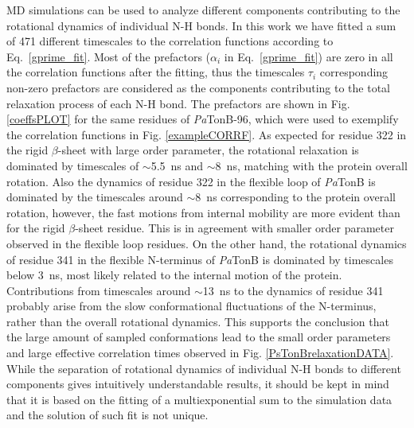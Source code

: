 \documentclass[journal=jpcbfk,manuscript=article]{achemso}
\begin{document}
MD simulations can be used to analyze different components contributing to
the rotational dynamics of individual N-H bonds.
In this work we have fitted a sum of 471 different
timescales to the correlation functions according to Eq.~\ref{gprime_fit}.
Most of the prefactors ($\alpha_i$ in Eq.~\ref{gprime_fit}) are zero
in all the correlation functions after the fitting,
thus the timescales $\tau_i$ corresponding non-zero prefactors
are considered as the components contributing to the total relaxation process of each N-H bond.
The prefactors are shown in Fig. \ref{coeffsPLOT} for the same residues
of {\it Pa}TonB-96, which were used to exemplify the correlation functions in Fig. \ref{exampleCORRF}.
As expected for residue 322 in the rigid $\beta$-sheet with large order parameter,
the rotational relaxation is dominated by timescales of $\sim$5.5~ns and $\sim$8~ns,
matching with the protein overall
rotation. Also the dynamics of residue 322 in the flexible loop of {\it Pa}TonB is
dominated by the timescales around $\sim$8~ns corresponding to the protein overall rotation,
however, the fast motions from internal mobility are more evident than for the
rigid $\beta$-sheet residue. This is in agreement with smaller order parameter observed
in the flexible loop residues. On the other hand, the rotational dynamics of
residue 341 in the flexible N-terminus of {\it Pa}TonB is dominated by timescales
below 3~ns, most likely related to the internal motion of the protein.
Contributions from timescales around $\sim$13~ns to the dynamics of residue 341 probably
arise from the slow conformational fluctuations of the N-terminus, rather than the overall
rotational dynamics. This supports the conclusion that the large amount of sampled
conformations lead to the small order parameters and large effective correlation times
observed in Fig. \ref{PsTonBrelaxationDATA}.
While the separation of rotational dynamics of individual N-H bonds to different components
gives intuitively understandable results, it should be kept in mind that
it is based on the fitting of a multiexponential sum to the simulation data and the solution
of such fit is not unique.
\end{document}
